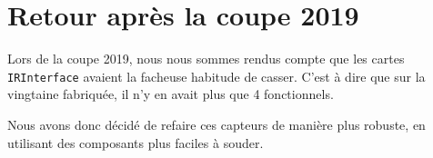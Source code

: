 ﻿\section{Retour après la coupe 2019}

Lors de la coupe 2019, nous nous sommes rendus compte que les cartes \verb|IRInterface|
avaient la facheuse habitude de casser. C'est à dire que sur la vingtaine fabriquée,
il n'y en avait plus que 4 fonctionnels.

Nous avons donc décidé de refaire ces capteurs de manière plus robuste, en utilisant
des composants plus faciles à souder.

